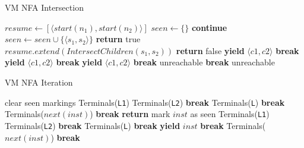 \begin{algorithm}
\caption{VM NFA Intersection} \label{algo:regexinter}
\begin{algorithmic}
  \State $resume \gets [\langle start(n_1), start(n_2) \rangle]$
  \State $seen \gets \{\}$
      \State \textbf{continue}
    \EndIf
    \State $seen \gets seen \cup \{\langle s_1, s_2 \rangle\}$
      \State \textbf{return} true
    \EndIf
    \State $resume.extend(IntersectChildren(s_1, s_2))$
  \EndWhile
  \State \textbf{return} false
\EndProcedure
{}
          \State \textbf{yield} $\langle c1, c2 \rangle$
          \State \textbf{break}
        \EndCase
              \State \textbf{yield} $\langle c1, c2 \rangle$
              \State \textbf{break}
            \EndCase
              \If{$\alpha_1 \cap \alpha_2 \not= \emptyset$}
                \State \textbf{yield} $\langle c1, c2 \rangle$
              \EndIf
              \State \textbf{break}
            \EndCase
              \State unreachable
            \EndCase
          \EndSwitch
          \State \textbf{break}
        \EndCase
          \State unreachable
        \EndCase
      \EndSwitch
    \EndFor
  \EndFor
\EndProcedure
\end{algorithmic}
\end{algorithm}

\begin{algorithm}
\caption{VM NFA Iteration} \label{algo:nfaiter}
\begin{algorithmic}
  \State clear seen markings
      \State Terminals({\tt L1})
      \State Terminals({\tt L2})
      \State \textbf{break}
    \EndCase
      \State Terminals({\tt L})
      \State \textbf{break}
    \EndCase
     \EndCase
     \EndCase
      \State Terminals($next(inst)$)
      \State \textbf{break}
    \EndCase
  \EndSwitch
\EndProcedure
{}
    \State \textbf{return}
  \EndIf
  \State mark $inst$ as seen
      \State Terminals({\tt L1})
      \State Terminals({\tt L2})
      \State \textbf{break}
    \EndCase
      \State Terminals({\tt L})
      \State \textbf{break}
    \EndCase
     \EndCase
      \State \textbf{yield} $inst$
      \State \textbf{break}
    \EndCase
      \State Terminals($next(inst)$)
      \State \textbf{break}
    \EndCase
  \EndSwitch
\EndProcedure
\end{algorithmic}
\end{algorithm}


